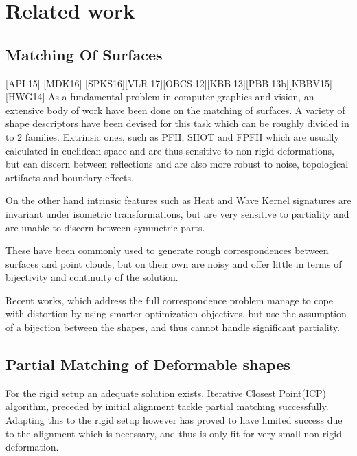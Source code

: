 \documentclass[10pt,twocolumn,letterpaper]{article}
\begin{document}
\section{Related work}\label{chap:related work}


\subsection{Matching Of Surfaces}
[APL15] [MDK16] [SPKS16][VLR17][OBCS12][KBB13][PBB13b][KBBV15][HWG14]
As a fundamental problem in computer graphics and vision, an extensive body of work have been done on the matching of surfaces.
A variety of shape descriptors have been devised for this task which can be roughly divided in to 2 families. 
Extrinsic ones, such as PFH\cite{rusu2008learning}, SHOT\cite{tombari2010unique} and FPFH\cite{rusu2009fast} which are usually calculated in euclidean space and are thus sensitive to non rigid deformations, but can discern between reflections and are also more robust to noise, topological artifacts and boundary effects.
 
On the other hand intrinsic features such as Heat\cite{bronstein2010scale} and Wave Kernel signatures\cite{aubry2011wave} are invariant under isometric transformations, but are very sensitive to partiality and are unable to discern between symmetric parts.

These have been commonly used to generate rough correspondences between surfaces and point clouds, but on their own are noisy and offer little in terms of bijectivity and continuity of the solution.

 Recent works, which address the full correspondence problem\cite{aigerman2015seamless,maron2016point,solomon2016entropic,vestner2017product} manage to cope with distortion by using smarter optimization objectives, but use the assumption of a bijection between the shapes, and thus cannot handle significant partiality.
\subsection{Partial Matching of Deformable shapes}

For the rigid setup an adequate solution exists. Iterative Closest Point(ICP)\cite{Aiger:2008:CSR:1360612.1360684} algorithm, preceded by initial alignment\cite{rusu2008towards} tackle partial matching successfully. Adapting this to the rigid setup however has proved to have limited success due to the alignment which is necessary, and thus is only fit for very small non-rigid deformation.
\end{document}
